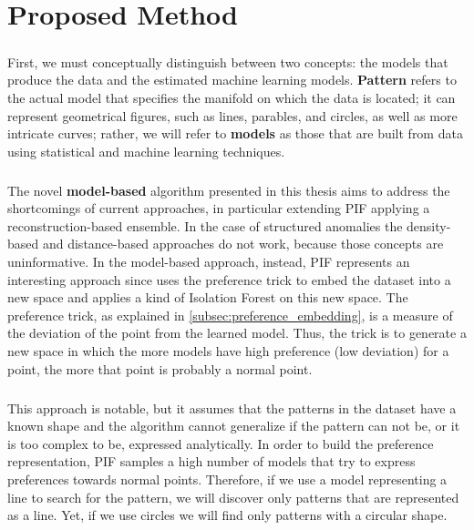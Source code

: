 \chapter{Proposed Method}
\label{ch:proposed_solution}

\paragraph{}
First, we must conceptually distinguish between two concepts: the models that produce the data and the estimated machine learning models. \textbf{Pattern} refers to the actual model that specifies the manifold on which the data is located; it can represent geometrical figures, such as lines, parables, and circles, as well as more intricate curves; rather, we will refer to \textbf{models} as those that are built from data using statistical and machine learning techniques.

\paragraph{}
The novel \textbf{model-based} algorithm presented in this thesis aims to address the shortcomings of current approaches, in particular extending PIF applying a reconstruction-based ensemble. In the case of structured anomalies the density-based and distance-based approaches do not work, because those concepts are uninformative. In the model-based approach, instead, PIF represents an interesting approach since uses the preference trick to embed the dataset into a new space and applies a kind of Isolation Forest on this new space. \newline
The preference trick, as explained in \ref{subsec:preference_embedding}, is a measure of the deviation of the point from the learned model. Thus, the trick is to generate a new space in which the more models have high preference (low deviation) for a point, the more that point is probably a normal point.

\paragraph{}
This approach is notable, but it assumes that the patterns in the dataset have a known shape and the algorithm cannot generalize if the pattern can not be, or it is too complex to be, expressed analytically. In order to build the preference representation, PIF samples a high number of models that try to express preferences towards normal points.  Therefore, if we use a model representing a line to search for the pattern, we will discover only patterns that are represented as a line. Yet, if we use circles we will find only patterns with a circular shape. 

